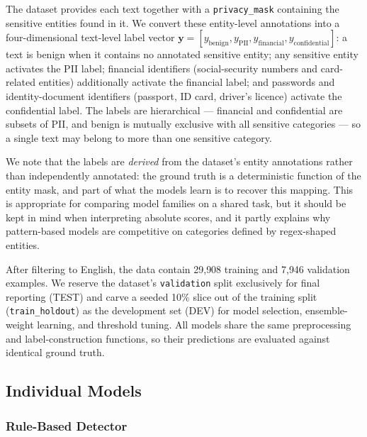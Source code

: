 \documentclass{article}
\begin{document}
The dataset provides each text together with a \texttt{privacy\_mask}
containing the sensitive entities found in it. We convert these
entity-level annotations into a four-dimensional text-level label
vector $\mathbf{y} = [y_{\text{benign}}, y_{\text{PII}},
y_{\text{financial}}, y_{\text{confidential}}]$: a text is benign when
it contains no annotated sensitive entity; any sensitive entity
activates the PII label; financial identifiers (social-security numbers
and card-related entities) additionally activate the financial label;
and passwords and identity-document identifiers (passport, ID card,
driver's licence) activate the confidential label. The labels are
hierarchical --- financial and confidential are subsets of PII, and
benign is mutually exclusive with all sensitive categories --- so a
single text may belong to more than one sensitive category.

We note that the labels are \emph{derived} from the dataset's entity
annotations rather than independently annotated: the ground truth is a
deterministic function of the entity mask, and part of what the models
learn is to recover this mapping. This is appropriate for comparing
model families on a shared task, but it should be kept in mind when
interpreting absolute scores, and it partly explains why pattern-based
models are competitive on categories defined by regex-shaped entities.

After filtering to English, the data contain 29{,}908 training and
7{,}946 validation examples. We reserve the dataset's
\texttt{validation} split exclusively for final reporting (TEST) and
carve a seeded 10\% slice out of the training split
(\texttt{train\_holdout}) as the development set (DEV) for model
selection, ensemble-weight learning, and threshold tuning. All models
share the same preprocessing and label-construction functions, so their
predictions are evaluated against identical ground truth.

\subsection{Individual Models}
\label{subsec:individual-models}

\subsubsection{Rule-Based Detector}
\label{subsubsec:rule-based}
\end{document}
